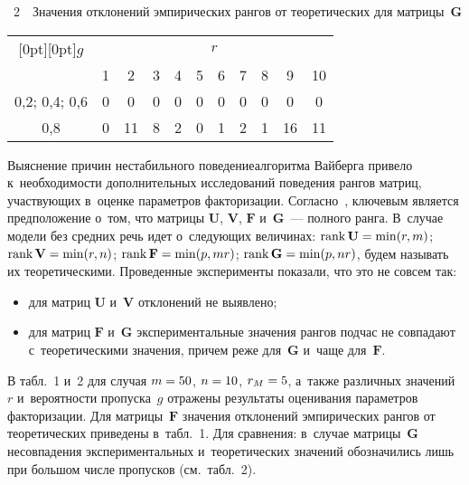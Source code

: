 \begin{multicols}{2}
{\begin{center}



\noindent
\parbox{79mm}{{\tablename~2}\ \ \small{Значения отклонений эмпирических рангов от теоретических для 
матрицы~$\mathbf{G}$}}

\vspace*{6pt}

{\small \tabcolsep=4.9pt
\begin{tabular}{|c|c|c|c|c|c|c|c|c|c|c|}
\hline
\raisebox{-6pt}[0pt][0pt]{$g$}&\multicolumn{10}{c|}{$r$}\\
\cline{2-11}
&1&2&3&4&5&6&7&8&9&10\hphantom{9}\\
\hline
0,2; 0,4; 0,6&0&0&0&0&0&0&0&0&0&0\\
0,8&0&11&8&2&0&1&2&1&16\hphantom{9}&11\hphantom{9}\\
\hline
\end{tabular}
}
\end{center}
}

\vspace*{6pt}
     
     Выяснение причин нестабильного поведение\linebreak алгоритма Вайберга 
привело к~необходимости дополнительных исследований поведения ран\-гов 
мат\-риц, участ\-ву\-ющих в~оцен\-ке па\-ра\-мет\-ров фак\-то\-ри\-за\-ции. 
     Согласно~\cite{4-kri}, ключевым является \mbox{предположение} о~том, что 
мат\-ри\-цы $\mathbf{U}$, $\mathbf{V}$, $\mathbf{F}$ и~$\mathbf{G}$~--- полного 
ранга. В~случае модели без средних речь идет о~сле\-ду\-ющих величинах: 
$\mathrm{rank}\,\mathbf{U}\hm= \min (r,m)$; $\mathrm{rank}\,\mathbf{V} \hm= \min(r,n)$; 
$\mathrm{rank}\,\mathbf{F}\hm= \min(p,mr)$; $\mathrm{rank}\,\mathbf{G}\hm= \min(p,nr)$, будем 
называть их теоретическими. Проведенные эксперименты показали, что это не 
совсем так:
     \begin{itemize}
\item для матриц $\mathbf{U}$ и~$\mathbf{V}$ отклонений не выявлено;
\item для матриц $\mathbf{F}$ и~$\mathbf{G}$ экспериментальные значения 
рангов подчас не совпадают с~теоретическими значения, причем реже 
для~$\mathbf{G}$ и~чаще для~$\mathbf{F}$.
\end{itemize}
     
     В табл.~1 и~2 для случая $m\hm=50$, $n\hm=10$, $r_M\hm=5$, а~также 
различных значений~$r$ и~вероятности пропуска~$g$ отражены результаты 
оценивания параметров факторизации. Для матрицы~$\mathbf{F}$ значения 
отклонений эмпирических рангов от теоретических приведены в~табл.~1.
     Для сравнения: в~случае матрицы~$\mathbf{G}$ несовпадения 
экспериментальных и~теоретических значений обозначились лишь при 
большом числе пропусков (см.\ табл.~2).




\end{multicols}
